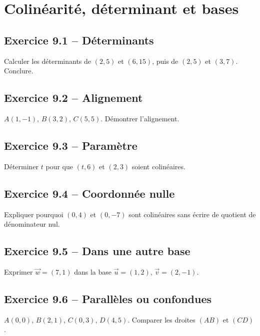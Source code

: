 \chapter{Colinéarité, déterminant et bases}
\section*{Exercice 9.1 -- Déterminants}
Calculer les déterminants de $(2,5)$ et $(6,15)$, puis de $(2,5)$ et $(3,7)$. Conclure.

\section*{Exercice 9.2 -- Alignement}
$A(1,-1)$, $B(3,2)$, $C(5,5)$. Démontrer l'alignement.

\section*{Exercice 9.3 -- Paramètre}
Déterminer $t$ pour que $(t,6)$ et $(2,3)$ soient colinéaires.

\section*{Exercice 9.4 -- Coordonnée nulle}
Expliquer pourquoi $(0,4)$ et $(0,-7)$ sont colinéaires sans écrire de quotient de dénominateur nul.

\section*{Exercice 9.5 -- Dans une autre base}
Exprimer $\vec w=(7,1)$ dans la base $\vec u=(1,2)$, $\vec v=(2,-1)$.

\section*{Exercice 9.6 -- Parallèles ou confondues}
$A(0,0)$, $B(2,1)$, $C(0,3)$, $D(4,5)$. Comparer les droites $(AB)$ et $(CD)$.
